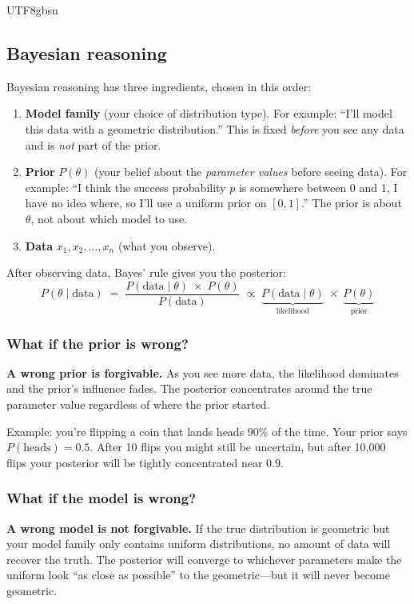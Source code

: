 \documentclass[11pt]{article}
\begin{document}
\begin{CJK}{UTF8}{gbsn}
\subsection*{Bayesian reasoning}

Bayesian reasoning has three ingredients, chosen in this order:

\begin{enumerate}
  \item \textbf{Model family} (your choice of distribution type). For example: ``I'll model this data with a geometric distribution.'' This is fixed \emph{before} you see any data and is \emph{not} part of the prior.
  \item \textbf{Prior} $P(\theta)$ (your belief about the \emph{parameter values} before seeing data). For example: ``I think the success probability $p$ is somewhere between 0 and 1, I have no idea where, so I'll use a uniform prior on $[0,1]$.'' The prior is about $\theta$, not about which model to use.
  \item \textbf{Data} $x_1, x_2, \dots, x_n$ (what you observe).
\end{enumerate}

After observing data, Bayes' rule gives you the posterior:
\[
  P(\theta \mid \text{data})
  \;=\;
  \frac{P(\text{data} \mid \theta) \;\times\; P(\theta)}{P(\text{data})}
  \;\propto\;
  \underbrace{P(\text{data} \mid \theta)}_{\text{likelihood}} \;\times\; \underbrace{P(\theta)}_{\text{prior}}
\]

\subsubsection*{What if the prior is wrong?}

\textbf{A wrong prior is forgivable.} As you see more data, the likelihood dominates and the prior's influence fades. The posterior concentrates around the true parameter value regardless of where the prior started.

Example: you're flipping a coin that lands heads 90\% of the time. Your prior says $P(\text{heads}) = 0.5$. After 10 flips you might still be uncertain, but after 10{,}000 flips your posterior will be tightly concentrated near 0.9.

\subsubsection*{What if the model is wrong?}

\textbf{A wrong model is not forgivable.} If the true distribution is geometric but your model family only contains uniform distributions, no amount of data will recover the truth. The posterior will converge to whichever parameters make the uniform look ``as close as possible'' to the geometric---but it will never become geometric.


\end{CJK}
\end{document}
